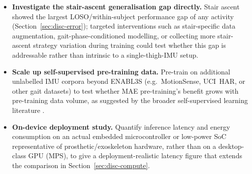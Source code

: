 \begin{itemize}

    \item \textbf{Investigate the stair-ascent generalisation gap directly.}
    Stair ascent showed the largest LOSO/within-subject performance gap of
    any activity (Section~\ref{sec:disc-error}); targeted interventions such
    as stair-specific data augmentation, gait-phase-conditioned modelling, or
    collecting more stair-ascent strategy variation during training could
    test whether this gap is addressable rather than intrinsic to a
    single-thigh-IMU setup.

    \item \textbf{Scale up self-supervised pre-training data.} Pre-train on
    additional unlabelled IMU corpora beyond ENABL3S (e.g.\ MotionSense,
    UCI~HAR, or other gait datasets) to test whether MAE pre-training's
    benefit grows with pre-training data volume, as suggested by the broader
    self-supervised learning literature \cite{PLACEHOLDER}.

    \item \textbf{On-device deployment study.} Quantify inference latency and
    energy consumption on an actual embedded microcontroller or low-power SoC
    representative of prosthetic/exoskeleton hardware, rather than on a
    desktop-class GPU (MPS), to give a deployment-realistic latency figure
    that extends the comparison in Section~\ref{sec:disc-compute}.
\end{itemize}

